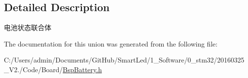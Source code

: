\subsection{\-Detailed \-Description}
电池状态联合体 

\-The documentation for this union was generated from the following file\-:\begin{DoxyCompactItemize}
\item 
\-C\-:/\-Users/admin/\-Documents/\-Git\-Hub/\-Smart\-Led/1\-\_\-\-Software/0\-\_\-stm32/20160325\-\_\-\-V2./\-Code/\-Board/\hyperlink{_bsp_battery_8h}{\-Bsp\-Battery.\-h}\end{DoxyCompactItemize}
